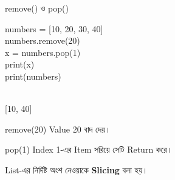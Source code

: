 

\begin{codeoutputbox}{\textenglish{\ttfamily remove()} ও \textenglish{\ttfamily pop()}}

\noindent
\begin{minipage}[t]{0.54\linewidth}
\codeheading

\begin{english}
\ttfamily
numbers = [10, 20, 30, 40]\\
numbers.remove(20)\\
x = numbers.pop(1)\\
print(x)\\
print(numbers)
\end{english}

\end{minipage}
\hfill
\begin{minipage}[t]{0.42\linewidth}
\outputheading

\begin{english}
\\{}
[10, 40]
\end{english}

\medskip

\textenglish{\ttfamily remove(20)}
Value 20 বাদ দেয়।

\textenglish{\ttfamily pop(1)}
Index 1-এর Item সরিয়ে সেটি Return করে।

\end{minipage}

\end{codeoutputbox}



List-এর নির্দিষ্ট অংশ নেওয়াকে \textbf{Slicing} বলা হয়।

